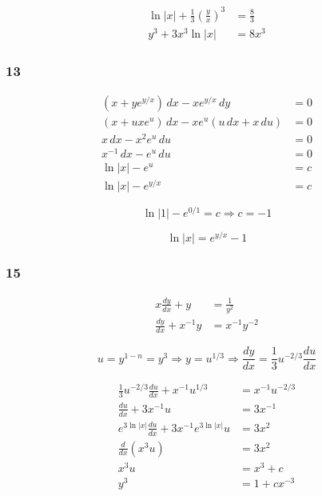 \documentclass{article}
\begin{document}
\begin{align*}
  \ln |x| + \frac{1}{3} \left( \frac{y}{x} \right)^3 & = \frac{8}{3} \\
  y^3 + 3 x^3 \ln |x|                                & = 8 x^3
\end{align*}

\subsubsection{13}

\begin{align*}
  (x + y e^{y / x}) \,dx - x e^{y / x} \,dy    & = 0 \\
  (x + u x e^u) \,dx - x e^u (u \,dx + x \,du) & = 0 \\
  x \,dx - x^2 e^u \,du                        & = 0 \\
  x^{-1} \,dx - e^u \,du                       & = 0 \\
  \ln |x| - e^u                                & = c \\
  \ln |x| - e^{y / x}                          & = c
\end{align*}

\[\ln |1| - e^{0 / 1} = c \Rightarrow c = -1\]

\[\ln |x| = e^{y / x} - 1\]

\subsubsection{15}

\begin{align*}
  x \frac{dy}{dx} + y      & = \frac{1}{y^2} \\
  \frac{dy}{dx} + x^{-1} y & = x^{-1} y^{-2}
\end{align*}

\[u = y^{1 - n} = y^3 \Rightarrow y = u^{1 / 3} \Rightarrow \frac{dy}{dx} = \frac{1}{3} u^{-2 / 3} \frac{du}{dx}\]

\begin{align*}
  \frac{1}{3} u^{-2 / 3} \frac{du}{dx} + x^{-1} u^{1 / 3} & = x^{-1} u^{-2 / 3} \\
  \frac{du}{dx} + 3 x^{-1} u                              & = 3 x^{-1}          \\
  e^{3 \ln |x|} \frac{du}{dx} + 3 x^{-1} e^{3 \ln |x|} u  & = 3 x^2             \\
  \frac{d}{dx} (x^3 u)                                    & = 3 x^2             \\
  x^3 u                                                   & = x^3 + c           \\
  y^3                                                     & = 1 + c x^{-3}
\end{align*}
\end{document}
